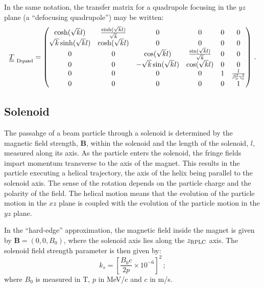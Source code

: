 In the same notation, the transfer matrix for a quadrupole focusing in
the $yz$ plane (a ``defocusing quadrupole'') may be written: 
\begin{equation}
  \underline{\underline{T}}_{\rm~Dquad} =
    \begin{pmatrix}
          \cosh(\sqrt{k} l) & \frac{\sinh(\sqrt{k} l)}{\sqrt{k}} & 0 & 0             & 0 & 0 \\
 \sqrt{k} \sinh(\sqrt{k} l) &                  \cosh(\sqrt{k} l) & 0 & 0             & 0 & 0 \\
          0 & 0 &            \cos(\sqrt{k} l) &  \frac{\sin(\sqrt{k} l)}{\sqrt{k}} & 0 & 0 \\
          0 & 0 &  -\sqrt{k} \sin(\sqrt{k} l) &                   \cos(\sqrt{k} l) & 0 & 0 \\
          0 & 0 & 0 & 0 & 1 & \frac{l}{\beta_0^2 \gamma_0^2} \\
          0 & 0 & 0 & 0 & 0 &                             1
        \end{pmatrix} \, .
\end{equation}

\subsection{Solenoid}

The passahge of a beam particle through a solenoid is determined by
the magnetic field strength, $\bm{B}$, within the solenoid and the
length of the solenoid, $l$, measured along its axis.
As the particle enters the solenoid, the fringe fields impart momentum
transverse to the axis of the magnet.
This results in the particle executing a helical trajectory, the axis
of the helix being parallel to the solenoid axis.
The sense of the rotation depends on the particle charge and the
polarity of the field.
The helical motion means that the evolution of the particle motion in
the $xz$ plane is coupled with the evolution of the particle motion in
the $yz$ plane.

In the ``hard-edge'' approximation, the magnetic field inside the
magnet is given by $\bm{B} = (0, 0, B_0)$, where the solenoid axis
lies along the $z_{\rm RPLC}$ axis.
The solenoid field strength parameter is then given by:
\begin{equation}
  k_s = \left[ \frac{B_0 c}{2p} \times 10^{-6} \right]^2\,;
\end{equation}
where $B_0$ is measured in T, $p$ in MeV/c and $c$ in m/s.

